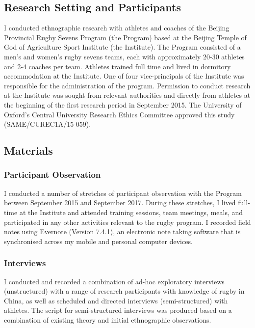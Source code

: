 \begin{CJK}{UTF8}{gbsn}
\subsection{Research Setting and Participants}
I conducted ethnographic research with athletes and coaches of the Beijing Provincial Rugby Sevens Program (the Program) based at the Beijing Temple of God of Agriculture Sport Institute (the Institute).  The Program consisted of a men's and women's rugby sevens teams, each with approximately 20-30 athletes and 2-4 coaches per team.  Athletes trained full time and lived in dormitory accommodation at the Institute.  One of four vice-principals of the Institute was responsible for the administration of the program.  Permission to conduct research at the Institute was sought from relevant authorities and directly from athletes at the beginning of the first research period in September 2015. The University of Oxford’s Central University Research Ethics Committee approved this study (SAME/CUREC1A/15-059).


\subsection{Materials}

  \subsubsection{Participant Observation}
   I conducted a number of stretches of participant observation with the Program between September 2015 and September 2017.  During these stretches, I lived full-time at the Institute and attended training sessions, team meetings, meals, and participated in any other activities relevant to the rugby program.  I recorded field notes using Evernote (Version 7.4.1), an electronic note taking software that is synchronised across my mobile and personal computer devices.

  \subsubsection{Interviews}
  I conducted and recorded a combination of ad-hoc exploratory interviews (unstructured) with a range of research participants with knowledge of rugby in China, as well as scheduled and directed interviews (semi-structured) with athletes.  The script for semi-structured interviews was produced based on a combination of existing theory and initial ethnographic observations.


\end{CJK}
